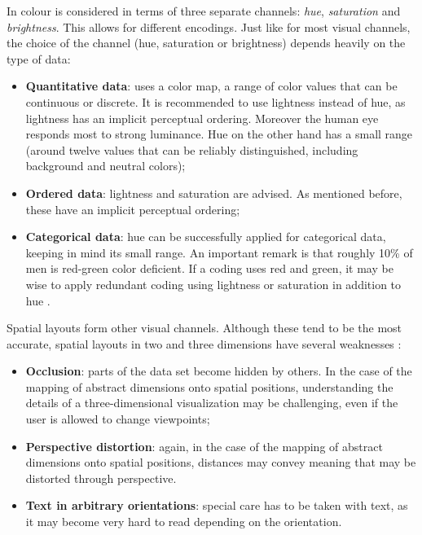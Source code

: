 
In \cite{shirley:2009} colour is considered in terms of three separate channels: \emph{hue}, \emph{saturation} and \emph{brightness}. This allows for different encodings. Just like for most visual channels, the choice of the channel (hue, saturation or brightness) depends heavily on the type of data:

\begin{itemize}
	\item \textbf{Quantitative data}: uses a color map, a range of color values that can be continuous or discrete. It is recommended to use lightness instead of hue, as lightness has an implicit perceptual ordering. Moreover the human eye responds most to strong luminance. Hue on the other hand has a small range (around twelve values that can be reliably distinguished, including background and neutral colors);
	\item \textbf{Ordered data}: lightness and saturation are advised. As mentioned before, these have an implicit perceptual ordering;
	\item \textbf{Categorical data}: hue can be successfully applied for categorical data, keeping in mind its small range.
An important remark is that roughly 10\% of men is red-green color deficient. If a coding uses red and green, it may be wise to apply redundant coding using lightness or saturation in addition to hue \cite{shirley:2009}.
\end{itemize}

Spatial layouts form other visual channels. Although these tend to be the most accurate, spatial layouts in two and three dimensions have several weaknesses \cite{shirley:2009}:

\begin{itemize}
	\item \textbf{Occlusion}: parts of the data set become hidden by others. In the case of the mapping of abstract dimensions onto spatial positions, understanding the details of a three-dimensional visualization may be challenging, even if the user is allowed to change viewpoints;
	\item \textbf{Perspective distortion}: again, in the case of the mapping of abstract dimensions onto spatial positions, distances may convey meaning that may be distorted through perspective.
	\item \textbf{Text in arbitrary orientations}: special care has to be taken with text, as it may become very hard to read depending on the orientation.
\end{itemize}


